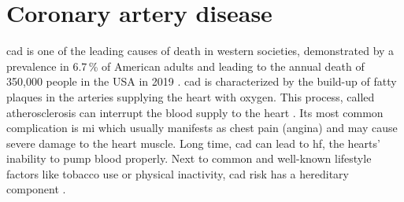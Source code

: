 \section{Coronary artery disease}
\label{sec:cad}
\Ac{cad} is one of the leading causes of death in western societies, demonstrated by a prevalence in 6.7\,\% of American adults and leading to the annual death of 350,000 people in the USA in 2019 \cite{centersfordiseasecontrolandpreventionHeartDiseaseFacts2022, fryarPrevalenceUncontrolledRisk2012}. \Ac{cad} is characterized by the build-up of fatty plaques in the arteries supplying the heart with oxygen. This process, called atherosclerosis can interrupt the blood supply to the heart \cite{nationalhealthserviceHeartAttack2017}. Its most common complication is \ac{mi} which usually manifests as chest pain (angina) and may cause severe damage to the heart muscle. Long time, \ac{cad} can lead to \ac{hf}, the hearts' inability to pump blood properly. Next to common and well-known lifestyle factors like tobacco use or physical inactivity, \ac{cad} risk has a hereditary component \cite{montalescot2013ESCGuidelines2013}.


